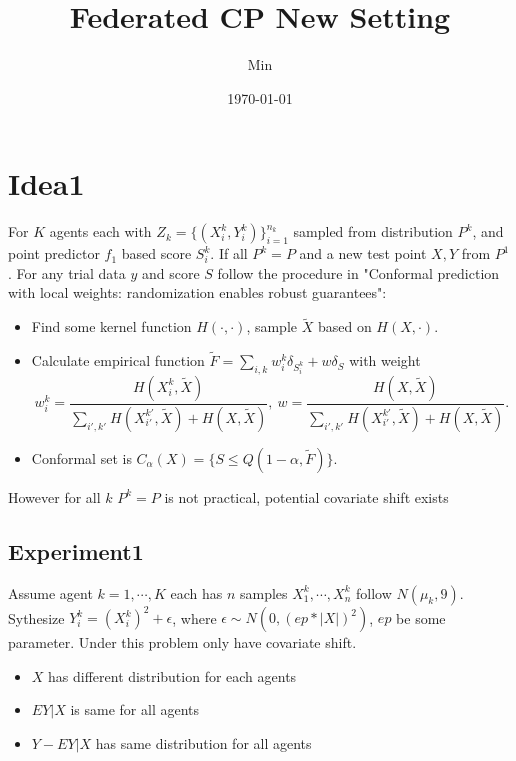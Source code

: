 \documentclass[12pt, a4paper, oneside]{article}
\title{\textbf{Federated CP New Setting}}
\author{Min}
\date{\today}
\begin{document}
\maketitle
\tableofcontents
\setcounter{page}{1}
\section{Idea1}
    For $K$ agents each with $Z_k=\{(X_i^k,Y_i^k)\}_{i=1}^{n_k}$ sampled from distribution $P^k$, and point predictor $f_1$ based score $S_i^k$. If all $P^k=P$ and a new test point $X,Y$ from $P^1$. For any trial data $y$ and score $S$ follow the procedure in "Conformal prediction with local weights: randomization enables robust guarantees"\cite{hore2023conformal}:
    \begin{itemize}
        \item Find some kernel function $H(\cdot,\cdot)$, sample $\tilde{X}$ based on $H(X,\cdot)$.
        \item Calculate empirical function $\tilde{F}=\overset{}{\underset{i,k}\sum}w_i^k\delta_{S_i^k}+w\delta_{S}$ with weight
        \begin{equation*}
            w_i^k=\dfrac{H(X_i^k,\tilde{X})}{\overset{}{\underset{i',k'}\sum}H(X_{i'}^{k'},\tilde{X})+H(X,\tilde{X})},\ w=\dfrac{H(X,\tilde{X})}{\overset{}{\underset{i',k'}\sum}H(X_{i'}^{k'},\tilde{X})+H(X,\tilde{X})}.
        \end{equation*}
        \item Conformal set is $C_\alpha(X)=\{S\leq Q(1-\alpha,\tilde{F})\}$.
    \end{itemize}


    However for all $k$ $P^k=P$ is not practical, potential covariate shift exists

\subsection{Experiment1}
    Assume agent $k=1,\cdots,K$ each has $n$ samples $X_1^k,\cdots,X_n^k$ follow $N(\mu_k,9)$. Sythesize $Y_i^k=(X_i^k)^2+\epsilon$, where $\epsilon\sim N(0,(ep*|X|)^2)$, $ep$ be some parameter. Under this problem only have covariate shift.

    \begin{itemize}
        \item $X$ has different distribution for each agents
        \item $EY|X$ is same for all agents
        \item $Y-EY|X$ has same distribution for all agents
    \end{itemize}
    
\end{document}
